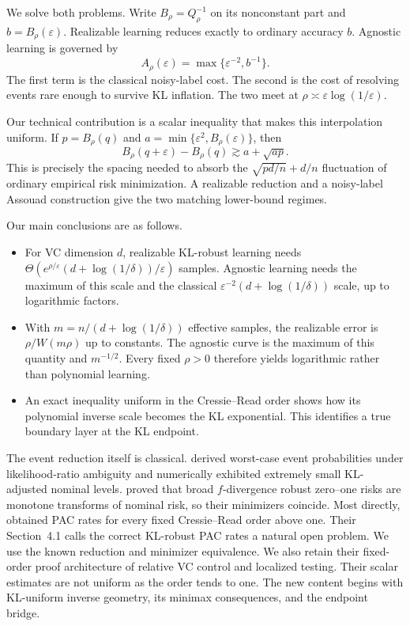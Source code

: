 \documentclass{article}
\theoremstyle{remark}
\newcommand{\eps}{\varepsilon}
\begin{document}
We solve both problems.  Write $B_\rho=Q_\rho^{-1}$ on its nonconstant part
and $b=B_\rho(\eps)$.  Realizable learning reduces exactly to ordinary
accuracy $b$.  Agnostic learning is governed by
\[
 A_\rho(\eps)=\max\{\eps^{-2},b^{-1}\}.
\]
The first term is the classical noisy-label cost.  The second is the cost of
resolving events rare enough to survive KL inflation.  The two meet at
$\rho\asymp\eps\log(1/\eps)$.

Our technical contribution is a scalar inequality that makes this
interpolation uniform.  If $p=B_\rho(q)$ and
$a=\min\{\eps^2,B_\rho(\eps)\}$, then
\begin{equation}
 B_\rho(q+\eps)-B_\rho(q)
 \gtrsim a+\sqrt{ap}.
 \label{eq:intro-spacing}
\end{equation}
This is precisely the spacing needed to absorb the
$\sqrt{p d/n}+d/n$ fluctuation of ordinary empirical risk minimization.  A
realizable reduction and a noisy-label Assouad construction give the two
matching lower-bound regimes.

Our main conclusions are as follows.
\begin{itemize}
\item For VC dimension $d$, realizable KL-robust learning needs
$\Theta(e^{\rho/\eps}(d+\log(1/\delta))/\eps)$ samples.  Agnostic learning
needs the maximum of this scale and the classical
$\eps^{-2}(d+\log(1/\delta))$ scale, up to logarithmic factors.
\item With $m=n/(d+\log(1/\delta))$ effective samples, the realizable error is
$\rho/W(m\rho)$ up to constants.  The agnostic curve is the maximum of this
quantity and $m^{-1/2}$.  Every fixed $\rho>0$ therefore yields logarithmic
rather than polynomial learning.
\item An exact inequality uniform in the Cressie--Read order shows how its
polynomial inverse scale becomes the KL exponential.  This identifies a true
boundary layer at the KL endpoint.
\end{itemize}

The event reduction itself is classical.  \citet{huhongso2013ambiguous}
derived worst-case event probabilities under likelihood-ratio ambiguity and
numerically exhibited extremely small KL-adjusted nominal levels.
\citet{hu2018distributionally} proved that broad $f$-divergence robust
zero--one risks are monotone transforms of nominal risk, so their minimizers
coincide.  Most directly, \citet{aignerhorev2026cressie} obtained PAC rates
for every fixed Cressie--Read order above one.  Their Section~4.1 calls the
correct KL-robust PAC rates a natural open problem.  We use the known reduction
and minimizer equivalence.  We also retain their fixed-order proof architecture
of relative VC control and localized testing.  Their scalar estimates are not
uniform as the order tends to one.  The new content begins with KL-uniform
inverse geometry, its minimax consequences, and the endpoint bridge.
\end{document}
